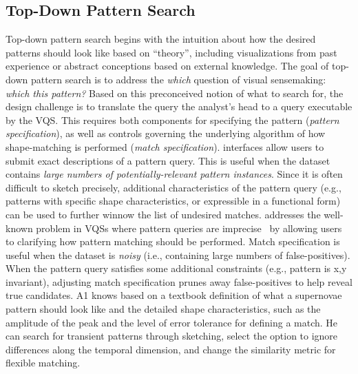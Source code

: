   \subsection{Top-Down Pattern Search}
  Top-down pattern search begins with the  intuition about how the desired patterns should look like based on ``theory'', including visualizations from past experience or abstract conceptions based on external knowledge. The goal of top-down pattern search is to address the \textit{which} question of visual sensemaking: \textit{which  this pattern?} Based on this preconceived notion of what to search for, the design challenge is to translate the query  the analyst's head to a query executable by the VQS. This requires both components for specifying the pattern (\textit{pattern specification}), as well as controls governing the underlying algorithm of how shape-matching is performed (\textit{match specification}).
   interfaces allow users to submit exact descriptions of a pattern query. This is useful when the dataset contains \emph{large numbers of potentially-relevant pattern instances}.
  Since it is often difficult to sketch precisely, additional characteristics of the pattern query (e.g., patterns with specific shape characteristics, or expressible in a functional form) can be used to further winnow the list of undesired matches.%
   addresses the well-known problem in VQSs where pattern queries are imprecise~\cite{correll2016semantics,Holz2009,Eichmann2015} by allowing users to clarifying how pattern matching should be performed. Match specification is useful when the dataset is \emph{noisy} (i.e., containing large numbers of false-positives). When the pattern query satisfies some additional constraints (e.g., pattern is x,y invariant), adjusting match specification prunes away false-positives to help reveal true candidates.
   A1 knows based on a textbook definition of what a supernovae pattern should look like and the detailed shape characteristics, such as the amplitude of the peak and the level of error tolerance for defining a match. He can search for transient patterns through sketching, select the option to ignore differences along the temporal dimension, and change the similarity metric for flexible matching.
